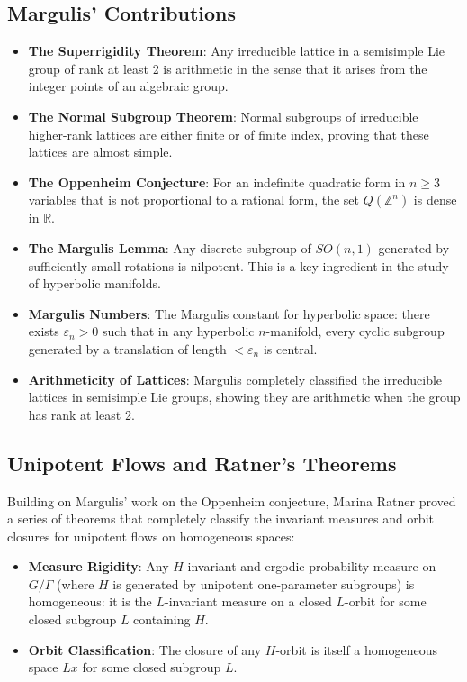 \subsection{Margulis' Contributions}
\begin{itemize}
\item \textbf{The Superrigidity Theorem}: Any irreducible lattice in a semisimple Lie group of rank at least 2 is arithmetic in the sense that it arises from the integer points of an algebraic group.
\item \textbf{The Normal Subgroup Theorem}: Normal subgroups of irreducible higher-rank lattices are either finite or of finite index, proving that these lattices are almost simple.
\item \textbf{The Oppenheim Conjecture}: For an indefinite quadratic form in $n \geq 3$ variables that is not proportional to a rational form, the set $Q(\mathbb{Z}^n)$ is dense in $\mathbb{R}$.
\item \textbf{The Margulis Lemma}: Any discrete subgroup of $SO(n,1)$ generated by sufficiently small rotations is nilpotent. This is a key ingredient in the study of hyperbolic manifolds.
\item \textbf{Margulis Numbers}: The Margulis constant for hyperbolic space: there exists $\varepsilon_n > 0$ such that in any hyperbolic $n$-manifold, every cyclic subgroup generated by a translation of length $<\varepsilon_n$ is central.
\item \textbf{Arithmeticity of Lattices}: Margulis completely classified the irreducible lattices in semisimple Lie groups, showing they are arithmetic when the group has rank at least 2.
\end{itemize}

\subsection{Unipotent Flows and Ratner's Theorems}

Building on Margulis' work on the Oppenheim conjecture, Marina Ratner proved a series of theorems that completely classify the invariant measures and orbit closures for unipotent flows on homogeneous spaces:
\begin{itemize}
\item \textbf{Measure Rigidity}: Any $H$-invariant and ergodic probability measure on $G/\Gamma$ (where $H$ is generated by unipotent one-parameter subgroups) is homogeneous: it is the $L$-invariant measure on a closed $L$-orbit for some closed subgroup $L$ containing $H$.
\item \textbf{Orbit Classification}: The closure of any $H$-orbit is itself a homogeneous space $Lx$ for some closed subgroup $L$.
\end{itemize}

